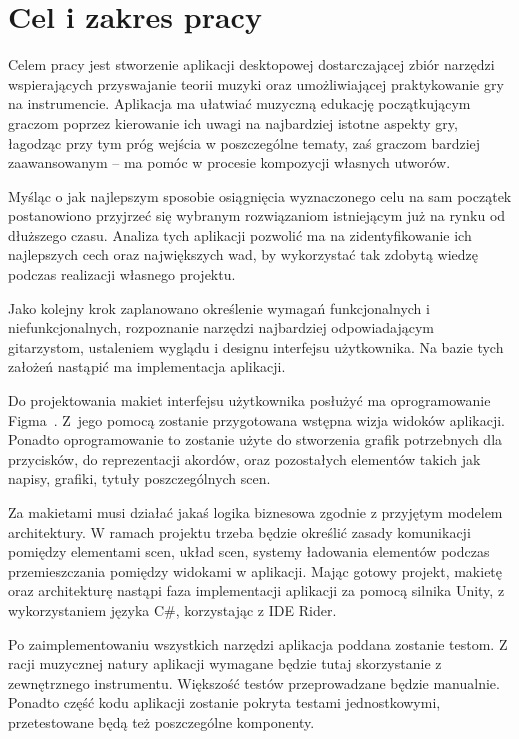 \section{Cel i zakres pracy}

Celem pracy jest stworzenie aplikacji desktopowej dostarczającej zbiór narzędzi wspierających przyswajanie teorii muzyki oraz umożliwiającej praktykowanie gry na instrumencie. Aplikacja ma ułatwiać muzyczną edukację początkującym graczom poprzez kierowanie ich uwagi na najbardziej istotne aspekty gry, łagodząc przy tym próg wejścia w poszczególne tematy, zaś graczom bardziej zaawansowanym -- ma pomóc w procesie kompozycji własnych utworów. 

Myśląc o jak najlepszym sposobie osiągnięcia wyznaczonego celu na sam początek postanowiono przyjrzeć się wybranym rozwiązaniom istniejącym już na rynku od dłuższego czasu. Analiza tych aplikacji pozwolić ma na zidentyfikowanie ich najlepszych cech oraz największych wad, by wykorzystać tak zdobytą wiedzę podczas realizacji własnego projektu. 

Jako kolejny krok zaplanowano określenie wymagań funkcjonalnych i niefunkcjonalnych, rozpoznanie narzędzi najbardziej odpowiadającym gitarzystom, ustaleniem wyglądu i designu interfejsu użytkownika. Na bazie tych założeń nastąpić ma implementacja aplikacji.

Do projektowania makiet interfejsu użytkownika posłużyć ma oprogramowanie Figma~\cite{Figma}. Z~jego pomocą zostanie przygotowana wstępna wizja widoków aplikacji. Ponadto oprogramowanie to zostanie użyte do stworzenia grafik potrzebnych dla przycisków, do reprezentacji akordów, oraz pozostałych elementów takich jak napisy, grafiki, tytuły poszczególnych scen. 

Za makietami musi działać jakaś logika biznesowa zgodnie z przyjętym modelem architektury. W ramach projektu trzeba będzie określić zasady komunikacji pomiędzy elementami scen, układ scen, systemy ładowania elementów podczas przemieszczania pomiędzy widokami w aplikacji. Mając gotowy projekt, makietę oraz architekturę nastąpi faza implementacji aplikacji za pomocą silnika Unity, z wykorzystaniem języka C\#, korzystając z IDE Rider.

Po zaimplementowaniu wszystkich narzędzi aplikacja poddana zostanie testom. Z racji muzycznej natury aplikacji wymagane będzie tutaj skorzystanie z zewnętrznego instrumentu. Większość testów przeprowadzane będzie manualnie. Ponadto część kodu aplikacji zostanie pokryta testami jednostkowymi, przetestowane będą też poszczególne komponenty. 


